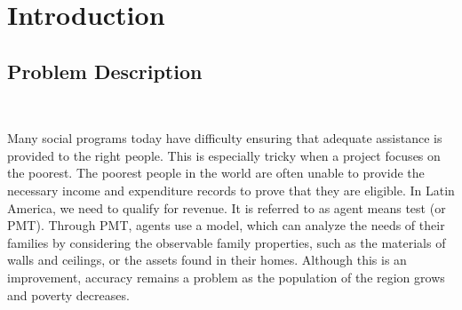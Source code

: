 \section{Introduction}\label{sec-intro}





\subsection{Problem Description}
\

Many social programs today have difficulty ensuring that adequate assistance is provided to the right people. This is especially tricky when a project focuses on the poorest. The poorest people in the world are often unable to provide the necessary income and expenditure records to prove that they are eligible. In Latin America, we need to qualify for revenue. It is referred to as agent means test (or PMT). Through PMT, agents use a model, which can analyze the needs of their families by considering the observable family properties, such as the materials of walls and ceilings, or the assets found in their homes. Although this is an improvement, accuracy remains a problem as the population of the region grows and poverty decreases.
\


